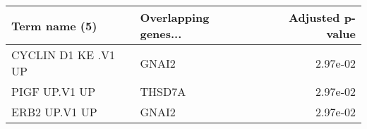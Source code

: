 \begin{tabular}{llr}
\toprule
      Term name (5) & Overlapping genes... &  Adjusted p-value \\
\midrule
CYCLIN D1 KE .V1 UP &                GNAI2 &          2.97e-02 \\
      PIGF UP.V1 UP &               THSD7A &          2.97e-02 \\
      ERB2 UP.V1 UP &                GNAI2 &          2.97e-02 \\
\bottomrule
\end{tabular}
